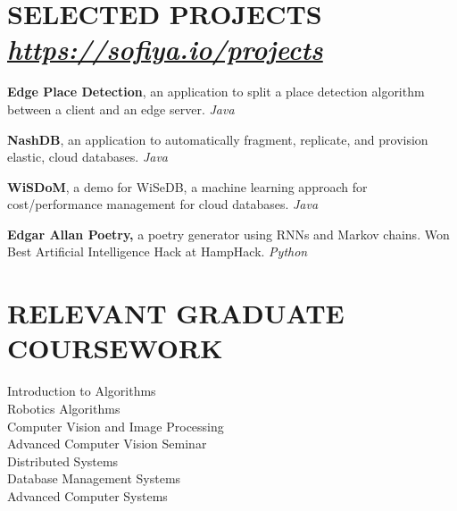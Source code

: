 \documentclass{res}
\begin{document}
\begin{resume}
\section{SELECTED PROJECTS ~  {\sl \href{https://sofiya.io/projects}{https://sofiya.io/projects}}}
\vspace{2mm}
\textbf{Edge Place Detection}, an application to split a place detection algorithm between a client and an edge server. {\sl Java}

\textbf{NashDB}, an application to automatically fragment, replicate, and provision elastic, cloud databases. {\sl Java }

\textbf{WiSDoM}, a demo for WiSeDB, a machine learning approach for cost/performance management for cloud databases. {\sl Java}
		
\textbf{Edgar Allan Poetry,} a poetry generator using RNNs and Markov chains. Won Best Artificial Intelligence Hack at HampHack. {\sl Python}
\vspace{2mm}

\section{RELEVANT GRADUATE COURSEWORK}
Introduction to Algorithms \\
Robotics Algorithms \\
Computer Vision and Image Processing \\
Advanced Computer Vision Seminar \\
Distributed Systems \\
Database Management Systems \\
Advanced Computer Systems \\
\end{resume}
\end{document}

